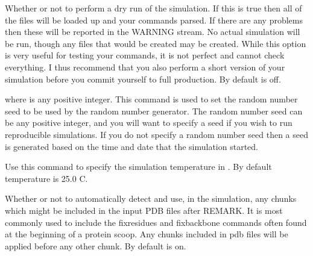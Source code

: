 \documentclass[letterpaper,10pt,english]{sphinxmanual}
\begin{document}
Whether or not to perform a dry run of the simulation. If this is true then all of the files will be loaded up and your commands parsed. If there are any problems then these will be reported in the WARNING stream. No actual simulation will be run, though any files that would be created may be created. While this option is very useful for testing your commands, it is not perfect and cannot check everything. I thus recommend that you also perform a short version of your simulation before you commit yourself to full production. By default  is off.

\ignorespaces 
\def\sphinxLiteralBlockLabel{\label{\detokenize{protoms:index-32}}}
%
\begin{sphinxVerbatim}[commandchars=\\\{\}]
 
\end{sphinxVerbatim}

where  is any positive integer. This command is used to set the random number seed to be used by the random number generator. The random number seed can be any positive integer, and you will want to specify a seed if you wish to run reproducible simulations. If you do not specify a random number seed then a seed is generated based on the time and date that the simulation started.

\ignorespaces 
\def\sphinxLiteralBlockLabel{\label{\detokenize{protoms:index-33}}}
%
\begin{sphinxVerbatim}[commandchars=\\\{\}]
 
\end{sphinxVerbatim}

Use this command to specify the simulation temperature in . By default temperature is 25.0 C.

\ignorespaces 
\def\sphinxLiteralBlockLabel{\label{\detokenize{protoms:index-34}}}
%
\begin{sphinxVerbatim}[commandchars=\\\{\}]
 
\end{sphinxVerbatim}

Whether or not to automatically detect and use, in the simulation, any chunks which might be included in the input PDB files after REMARK. It is most commonly used to include the fixresidues and fixbackbone commands often found at the beginning of a protein scoop. Any chunks included in pdb files will be applied before any other chunk. By default  is on.
\end{document}
